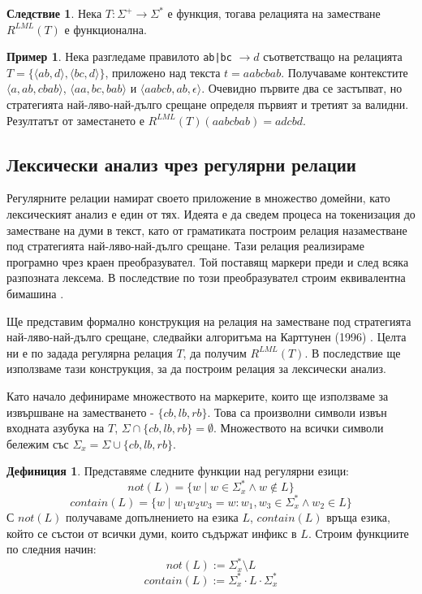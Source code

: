 \documentclass[12pt, oneside]{article}
\theoremstyle{definition}
\newtheorem{definition}{Дефиниция}[section]
\newtheorem{example}{Пример}[section]
\newtheorem{corollary}{Следствие}[section]
\begin{document}
\begin{corollary}
	Нека \( T: \Sigma^+ \to \Sigma^* \) е функция, тогава релацията на заместване \( R^{LML}(T) \) е функционална.
\end{corollary}

\begin{example}
	Нека разгледаме правилото \verb/ab|bc/ \( \to d \) съответстващо на релацията \(T = \{ \langle ab,d \rangle, \langle bc, d \rangle \} \), приложено над текста \( t = aabcbab \). Получаваме контекстите \( \langle a, ab, cbab \rangle \), \( \langle aa, bc, bab \rangle \) и \( \langle aabcb, ab, \epsilon \rangle \). Очевидно първите два се застъпват, но стратегията най-ляво-най-дълго срещане определя първият и третият за валидни. Резултатът от заместането е \( R^{LML}(T)(aabcbab) = adcbd \).
\end{example}

\pagebreak
\subsection{Лексически анализ чрез регулярни релации}
\label{sec:LexARegRel}
Регулярните релации намират своето приложение в множество домейни, като лексическият анализ е един от тях. Идеята е да сведем процеса на токенизация до заместване на думи в текст, като от граматиката построим релация назаместване под стратегията най-ляво-най-дълго срещане. Тази релация реализираме програмно чрез краен преобразувател. Той поставящ маркери преди и след всяка разпозната лексема. В последствие по този преобразувател строим еквивалентна бимашина \cite{GerdjikovEtAl:2017}.

Ще представим формално конструкция на релация на заместване под стратегията най-ляво-най-дълго срещане, следвайки алгоритъма на Карттунен (1996) \cite{Karttunen:96}. Целта ни е по задада регулярна релация \(T\), да получим \( R^{LML}(T) \). В последствие ще използваме тази конструкция, за да построим релация за лексически анализ.

Като начало дефинираме множеството на маркерите, които ще използваме за извършване на заместването - \( \{ cb, lb, rb \} \). Това са произволни символи извън входната азубука на \(T\), \( \Sigma \cap \{ cb, lb, rb \} = \emptyset \). Множеството на всички символи бележим със \( \Sigma_x = \Sigma \cup \{ cb, lb, rb \} \). 

\begin{definition}
	Представяме следните функции над регулярни езици:
	\[ not(L) = \{ w \mid w \in \Sigma_x^* \land w \notin L \} \]
	\[ contain(L) = \{ w \mid w_1w_2w_3 = w: w_1, w_3 \in \Sigma_x^* \land w_2 \in L \} \]
	С \( not(L) \) получаваме допълнението на езика \(L\), \( contain(L) \) връща езика, който се състои от всички думи, които съдържат инфикс в \(L\). Строим функциите по следния начин:
	\[ not(L) := \Sigma_x^* \setminus L \]
	\[ contain(L) := \Sigma_x^* \cdot L \cdot \Sigma_x^* \]
\end{definition}
\end{document}
